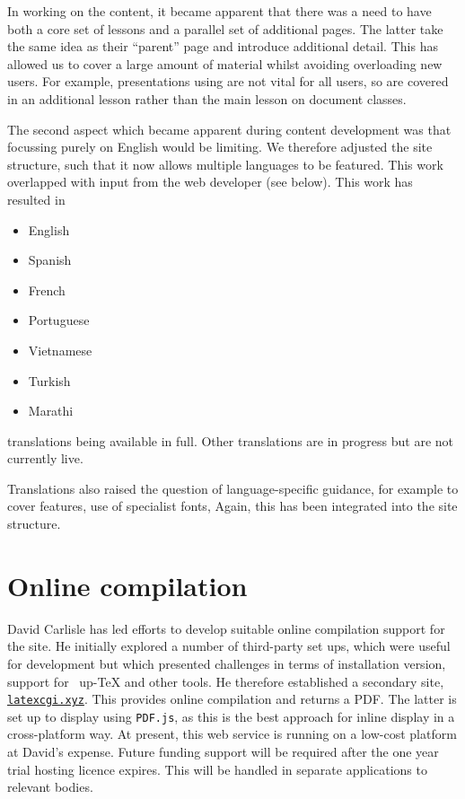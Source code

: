\documentclass[a4paper]{article}
\begin{document}
In working on the content, it became apparent that there was a need to have
both a core set of lessons and a parallel set of additional pages. The latter
take the same idea as their \enquote{parent} page and introduce additional
detail. This has allowed us to cover a large amount of material whilst avoiding
overloading new users. For example, presentations using  are not
vital for all users, so are covered in an additional lesson rather than
the main lesson on document classes.

The second aspect which became apparent during content development was that
focussing purely on English would be limiting. We therefore adjusted the site
structure, such that it now allows multiple languages to be featured. This work
overlapped with input from the web developer (see below). This work has
resulted in
\begin{itemize}
  \item English
  \item Spanish
  \item French
  \item Portuguese
  \item Vietnamese
  \item Turkish
  \item Marathi
\end{itemize}
translations being available in full. Other translations are in progress but
are not currently live.

Translations also raised the question of language-specific guidance, for
example to cover  features, use of specialist fonts, 
Again, this has been integrated into the site structure.

\section{Online compilation}

David Carlisle has led efforts to develop suitable online compilation support
for the site. He initially explored a number of third-party set ups, which were
useful for development but which presented challenges in terms of installation
version, support for ~up-\TeX{} and other tools. He therefore
established a secondary site, \href{https://latexcgi.xyz}{\nolinkurl{latexcgi.xyz}}.
This provides online
compilation and returns a PDF. The latter is set up to display using
\texttt{PDF.js}, as this is the best approach for inline display in a
cross-platform way. At present, this web service is running on a low-cost
platform at David's expense. Future funding support will be required after the one
year trial hosting licence expires. This will be handled in separate applications to relevant bodies.
\end{document}
